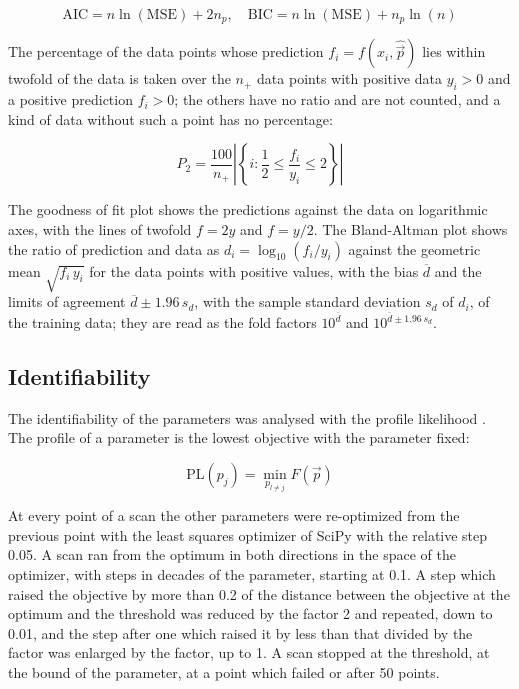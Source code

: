 \documentclass{article}
\begin{document}
\begin{equation}
\mathrm{AIC} = n \ln(\mathrm{MSE}) + 2 n_p, \quad \mathrm{BIC} = n \ln(\mathrm{MSE}) + n_p \ln(n)
\end{equation}

The percentage of the data points whose prediction $f_i = f(x_i, \hat{\vec{p}})$ lies within twofold of the data is taken over the $n_+$ data points with positive data $y_i > 0$ and a positive prediction $f_i > 0$; the others have no ratio and are not counted, and a kind of data without such a point has no percentage:

\begin{equation}
P_2 = \frac{100}{n_+} \left|\left\{ i : \frac{1}{2} \le \frac{f_i}{y_i} \le 2 \right\}\right|
\end{equation}

The goodness of fit plot shows the predictions against the data on logarithmic axes, with the lines of twofold $f = 2y$ and $f = y/2$. The Bland-Altman plot \cite{Bland1986} shows the ratio of prediction and data as $d_i = \log_{10}(f_i / y_i)$ against the geometric mean $\sqrt{f_i\, y_i}$ for the data points with positive values, with the bias $\overline{d}$ and the limits of agreement $\overline{d} \pm 1.96\, s_d$, with the sample standard deviation $s_d$ of $d_i$, of the training data; they are read as the fold factors $10^{\overline{d}}$ and $10^{\overline{d} \pm 1.96\, s_d}$.

\subsection{Identifiability}

The identifiability of the parameters was analysed with the profile likelihood \cite{Raue2009,Kreutz2013}. The profile of a parameter is the lowest objective with the parameter fixed:

\begin{equation}
\mathrm{PL}(p_j) = \min_{p_{l \neq j}} F(\vec{p})
\end{equation}

At every point of a scan the other parameters were re-optimized from the previous point with the least squares optimizer of SciPy with the relative step 0.05. A scan ran from the optimum in both directions in the space of the optimizer, with steps in decades of the parameter, starting at 0.1. A step which raised the objective by more than 0.2 of the distance between the objective at the optimum and the threshold was reduced by the factor 2 and repeated, down to 0.01, and the step after one which raised it by less than that divided by the factor was enlarged by the factor, up to 1. A scan stopped at the threshold, at the bound of the parameter, at a point which failed or after 50 points.
\end{document}
